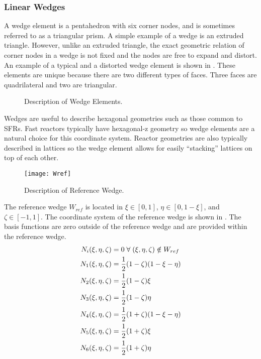     \subsubsection{Linear Wedges}
      A wedge element is a pentahedron with six corner nodes, and is sometimes
      referred to as a triangular prism. A simple example of a wedge is an
      extruded triangle. However, unlike an extruded triangle, the exact 
      geometric relation of corner nodes in a wedge is not fixed and the nodes 
      are free to expand and distort. An example of a typical and a distorted
      wedge element is shown in . These elements are
      unique because there are two different types of faces. Three faces are
      quadrilateral and two are triangular. 

      \begin{figure}
        \centering
        \vspace{0.2in}
        \caption{Description of Wedge Elements.}
        \label{fig:sketch_wedge}
      \end{figure}

      Wedges are useful to describe hexagonal geometries such as those common to
      SFRs. Fast reactors typically have hexagonal-z geometry so wedge
      elements are a natural choice for this coordinate system. 
      Reactor geometries are also typically described in lattices so
      the wedge element allows for easily ``stacking'' lattices on top of each
      other.

      \begin{figure}
        \centering
        \texttt{[image: Wref]}
        \caption{Description of Reference Wedge.}
        \label{fig:Wref}
      \end{figure}

      The reference wedge $W_{ref}$ is located in 
      $\xi \in [0,1]$, $\eta \in [0,1-\xi]$, and $\zeta \in [-1,1]$. The
      coordinate system of the reference wedge is shown in . The
      basis functions are zero outside of the reference wedge and are 
      provided within the reference wedge.
      \begin{align}
        N_i(\xi,\eta,\zeta) &= 0 \; \forall \; (\xi,\eta,\zeta)
          \notin W_{ref} \\
        N_1(\xi,\eta,\zeta) &= \frac{1}{2} (1-\zeta)(1-\xi-\eta) \\
        N_2(\xi,\eta,\zeta) &= \frac{1}{2} (1-\zeta)\xi \\
        N_3(\xi,\eta,\zeta) &= \frac{1}{2} (1-\zeta)\eta \\
        N_4(\xi,\eta,\zeta) &= \frac{1}{2} (1+\zeta)(1-\xi-\eta) \\
        N_5(\xi,\eta,\zeta) &= \frac{1}{2} (1+\zeta)\xi \\
        N_6(\xi,\eta,\zeta) &= \frac{1}{2} (1+\zeta)\eta 
      \end{align}

